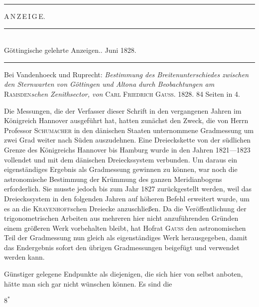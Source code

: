 \begin{center}\rule{.24\textwidth}{.4pt}\end{center}

\par\clearpage

\vspace*{.075\textheight}
\begin{center}{\LARGE A\,N\,Z\,E\,I\,G\,E.}\end{center}
\vspace{.045\textheight}
\begin{center}
\rule{.52\textwidth}{.4pt}\\[-.2ex]
{\small Göttingische gelehrte Anzeigen.. Juni 1828.}\\[-.2ex]
\rule{.52\textwidth}{.4pt}
\end{center}

Bei Vandenhoeck und Ruprecht: \textit{Bestimmung des Breitenunterschiedes
zwischen den Sternwarten von Göttingen und Altona durch Beobachtungen am}
\textsc{Ramsden}\textit{schen Zenithsector, von} \textsc{Carl Friedrich Gauss}.
1828. 84 Seiten in 4.

Die Messungen, die der Verfasser dieser Schrift in den vergangenen Jahren im
Königreich Hannover ausgeführt hat, hatten zunächst den Zweck, die von Herrn
Professor \textsc{Schumacher} in den dänischen Staaten unternommene Gradmessung um
zwei Grad weiter nach Süden auszudehnen. Eine Dreieckskette von der südlichen
Grenze des Königreichs Hannover bis Hamburg wurde in den Jahren 1821---1823
vollendet und mit dem dänischen Dreieckssystem verbunden. Um daraus ein
eigenständiges Ergebnis als Gradmessung gewinnen zu können, war noch die
astronomische Bestimmung der Krümmung des ganzen Meridianbogens erforderlich.
Sie musste jedoch bis zum Jahr 1827 zurückgestellt werden, weil das
Dreieckssystem in den folgenden Jahren auf höheren Befehl erweitert wurde,
um es an die \textsc{Krayenhoff}schen Dreiecke anzuschließen. Da die Veröffentlichung
der trigonometrischen Arbeiten aus mehreren hier nicht anzuführenden Gründen
einem größeren Werk vorbehalten bleibt, hat Hofrat \textsc{Gauss} den astronomischen
Teil der Gradmessung nun gleich als eigenständiges Werk herausgegeben, damit
das Endergebnis sofort den übrigen Gradmessungen beigefügt und verwendet
werden kann.

Günstiger gelegene Endpunkte als diejenigen, die sich hier von selbst anboten,
hätte man sich gar nicht wünschen können. Es sind die
\par\smallskip
\noindent\hfill \(8^{*}\)\hspace{.12\textwidth}\par


